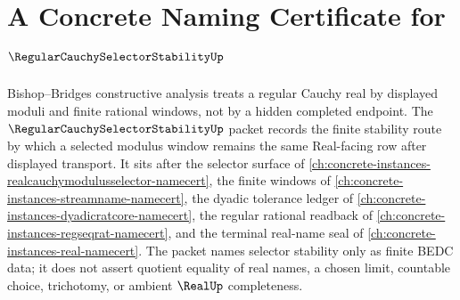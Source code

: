 \chapter{A Concrete Naming Certificate for $\RegularCauchySelectorStabilityUp$}
\label{ch:concrete-instances-regular-cauchy-selector-stability-namecert}

Bishop--Bridges constructive analysis treats a regular Cauchy real by displayed moduli and finite rational windows, not by a hidden completed endpoint. The $\RegularCauchySelectorStabilityUp$ packet records the finite stability route by which a selected modulus window remains the same Real-facing row after displayed transport. It sits after the selector surface of \autoref{ch:concrete-instances-realcauchymodulusselector-namecert}, the finite windows of \autoref{ch:concrete-instances-streamname-namecert}, the dyadic tolerance ledger of \autoref{ch:concrete-instances-dyadicratcore-namecert}, the regular rational readback of \autoref{ch:concrete-instances-regseqrat-namecert}, and the terminal real-name seal of \autoref{ch:concrete-instances-real-namecert}. The packet names selector stability only as finite BEDC data; it does not assert quotient equality of real names, a chosen limit, countable choice, trichotomy, or ambient $\RealUp$ completeness.

